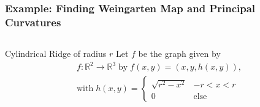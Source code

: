 \documentclass[9pt]{beamer}
\newcommand{\R}{\mathbb{R}} %
\begin{document}
\begin{frame}
\frametitle{Example: Finding Weingarten Map and Principal Curvatures}
\begin{columns}
  \begin{column}{0.5\textwidth}
    \begin{block}{Cylindrical Ridge of radius $r$}
      Let $f$ be the graph given by 
      \begin{gather*}
      f: \R^2 \to \R^3 \;\textrm{by}\; f(x,y) = (x,y,h(x,y)), \\
      \textrm{with}\;
      h(x,y) = \begin{cases}
      \sqrt{r^2 - x^2} & -r < x < r \\
      0 & \textrm{else}
      \end{cases}
      \end{gather*}
    \end{block}
  \end{column}
  

\end{columns}
\end{frame}
\end{document}
